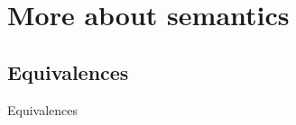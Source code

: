\section{More about semantics}
\subsection{Equivalences}

\begin{frame}{Equivalences}
	\begin{definition}
		
	\end{definition}
\end{frame}